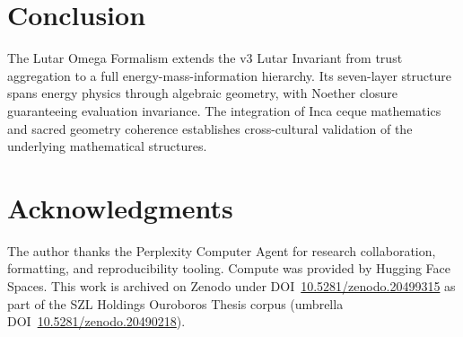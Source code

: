 \documentclass[11pt]{article}
\theoremstyle{plain}
\begin{document}
\section{Conclusion}

The Lutar Omega Formalism extends the v3 Lutar Invariant from trust aggregation to a full energy-mass-information hierarchy. Its seven-layer structure spans energy physics through algebraic geometry, with Noether closure guaranteeing evaluation invariance. The integration of Inca ceque mathematics and sacred geometry coherence establishes cross-cultural validation of the underlying mathematical structures.




\section*{Acknowledgments}
The author thanks the Perplexity Computer Agent for research collaboration, formatting, and
reproducibility tooling. Compute was provided by Hugging Face Spaces. This work is archived on
Zenodo under DOI~\href{https://doi.org/10.5281/zenodo.20499315}{10.5281/zenodo.20499315} as part of the SZL Holdings Ouroboros Thesis
corpus (umbrella DOI~\href{https://doi.org/10.5281/zenodo.20490218}{10.5281/zenodo.20490218}).

\nocite{01ref1,01ref2,01ref3,01ref4,01ref5,01ref6,01ref7,01ref8,01ref9,01ref10,01ref11,01ref12,01ref13}


\end{document}
